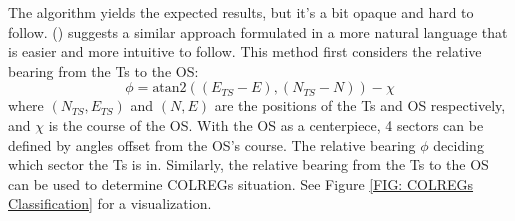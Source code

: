 The algorithm yields the expected results, but it's a bit opaque and hard to follow. 
(\cite{tam2010collision}) suggests a similar approach formulated in a more natural language that is easier
and more intuitive to follow. This method first considers the relative bearing from the \gls{Ts} to the \gls{OS}:
\begin{equation}
    \phi = \textrm{atan2}((E_{TS} - E) , (N_{TS} - N)) - \chi
\end{equation}
where $(N_{TS}, E_{TS})$ and $(N, E)$ are the positions of the \gls{Ts} and \gls{OS} respectively, and $\chi$ is the course of the \gls{OS}.
With the \gls{OS} as a centerpiece, 4 sectors can be defined by angles offset from the \gls{OS}'s course. The relative bearing $\phi$ 
deciding which sector the \gls{Ts} is in. Similarly, the relative bearing from the \gls{Ts} to the \gls{OS} can be
used to determine \gls{COLREGs} situation. See Figure \ref{FIG: COLREGs Classification} for a visualization.

